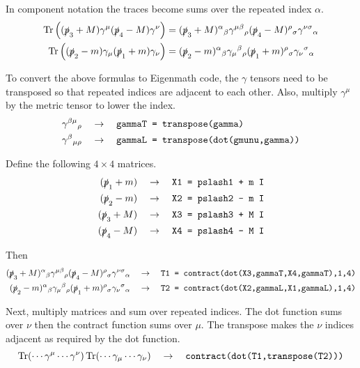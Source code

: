 \documentclass[12pt]{article}
\begin{document}
\bigskip
\noindent
In component notation the traces become sums over the repeated index $\alpha$.
\begin{align*}
\mathop{\rm Tr}\left((\slashed{p}_3+M)\gamma^\mu(\slashed{p}_4-M)\gamma^\nu\right)
&=
(\slashed{p}_3+M)^\alpha{}_\beta
\gamma^{\mu\beta}{}_\rho
(\slashed{p}_4-M)^\rho{}_\sigma
\gamma^{\nu\sigma}{}_\alpha
\\
\mathop{\rm Tr}\left((\slashed{p}_2-m)\gamma_\mu(\slashed{p}_1+m)\gamma_\nu\right)
&=
(\slashed{p}_2-m)^\alpha{}_\beta
\gamma_\mu{}^\beta{}_\rho
(\slashed{p}_1+m)^\rho{}_\sigma
\gamma_\nu{}^\sigma{}_\alpha
\end{align*}

\noindent
To convert the above formulas to Eigenmath code,
the $\gamma$ tensors need to be transposed
so that repeated indices are adjacent to each other.
Also, multiply $\gamma^\mu$ by the metric tensor to lower the index.
\begin{align*}
\gamma^{\beta\mu}{}_\rho\quad&\rightarrow\quad
\text{\tt gammaT = transpose(gamma)}\\
\gamma^\beta{}_{\mu\rho}\quad&\rightarrow\quad
\text{\tt gammaL = transpose(dot(gmunu,gamma))}
\end{align*}

\noindent
Define the following $4\times4$ matrices.
\begin{align*}
(\slashed{p}_1+m)\quad&\rightarrow\quad\text{\tt X1 = pslash1 + m I}\\
(\slashed{p}_2-m)\quad&\rightarrow\quad\text{\tt X2 = pslash2 - m I}\\
(\slashed{p}_3+M)\quad&\rightarrow\quad\text{\tt X3 = pslash3 + M I}\\
(\slashed{p}_4-M)\quad&\rightarrow\quad\text{\tt X4 = pslash4 - M I}
\end{align*}

\noindent
Then
\begin{align*}
(\slashed{p}_3+M)^\alpha{}_\beta
\gamma^{\mu\beta}{}_\rho
(\slashed{p}_4-M)^\rho{}_\sigma
\gamma^{\nu\sigma}{}_\alpha
\quad&\rightarrow\quad
\text{\tt T1 = contract(dot(X3,gammaT,X4,gammaT),1,4)}
\\
(\slashed{p}_2-m)^\alpha{}_\beta
\gamma_\mu{}^\beta{}_\rho
(\slashed{p}_1+m)^\rho{}_\sigma
\gamma_\nu{}^\sigma{}_\alpha
\quad&\rightarrow\quad
\text{\tt T2 = contract(dot(X2,gammaL,X1,gammaL),1,4)}
\end{align*}

\noindent
Next, multiply matrices and sum over repeated indices.
The dot function sums over $\nu$ then the contract function
sums over $\mu$. The transpose makes the $\nu$ indices adjacent
as required by the dot function.
$$
\mathop{\rm Tr}(\cdots\gamma^\mu\cdots\gamma^\nu)\mathop{\rm Tr}(\cdots\gamma_\mu\cdots\gamma_\nu)
\quad\rightarrow\quad
\text{\tt contract(dot(T1,transpose(T2)))}
$$
\end{document}
